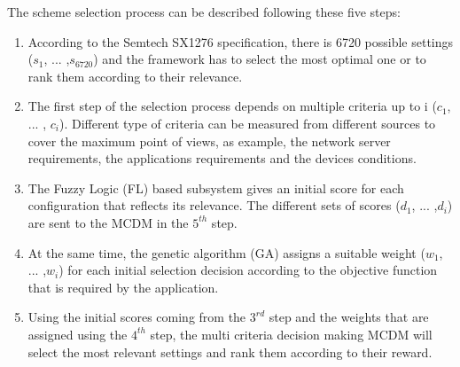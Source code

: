 The scheme selection process can be described following these five steps:

\begin{enumerate}
	\item According to the Semtech SX1276 specification\cite{lorasemtech}, there is 6720 possible settings ($s_{1}$, ... ,$s_{6720}$) and the framework has to select the most optimal one or to rank them according to their relevance.
	\item The first step of the selection process depends on multiple criteria up to i ($c_{1}$, ... , $c_{i}$).
		Different type of criteria can be measured from different sources to cover the maximum point of views,
		as example,
		the network server requirements, the applications requirements and the devices conditions.
	\item The Fuzzy Logic (FL) based subsystem gives an initial score for each configuration that reflects its relevance.
		The different sets of scores ($d_{1}$, ... ,$d_{i}$) are sent to the \ac{MCDM} in the $5^{th}$ step.
	\item At the same time,
			the genetic algorithm (GA) \cite{alkhawlani_access_2008} assigns a suitable weight ($w_{1}$, ... ,$w_{i}$) for each initial selection decision according to the objective function that is required by the application.
	\item Using the initial scores coming from the $3^{rd}$ step and the weights that are assigned using the $4^{th}$ step,
			the multi criteria decision making{} \ac{MCDM} will select the most relevant settings and rank them according to their reward.
\end{enumerate}

